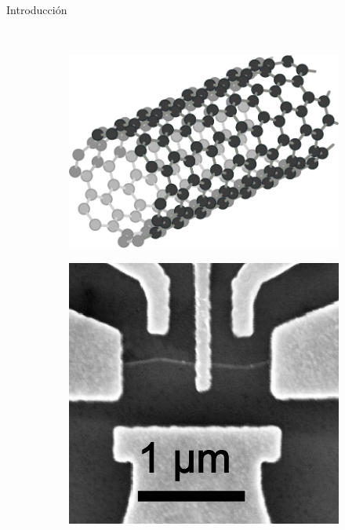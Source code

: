 \documentclass[aspectratio=169]{beamer}
\begin{document}
\begin{frame}{Introducción}
\begin{figure}
			\\
			\begin{subfigure}[b]{0.15\textwidth}
				\includegraphics[width=\textwidth]{cnt_structure.pdf}
				\caption{}
				\label{fig:cnt_struct}
			\end{subfigure}
			\begin{subfigure}[b]{0.15\textwidth}
				\includegraphics[width=\textwidth]{cnt_image.png}
				\caption{}
				\label{fig:cnt_image}
			\end{subfigure}
			\begin{subfigure}[b]{0.15\textwidth}

\end{subfigure}
\end{figure}
\end{frame}
\end{document}

